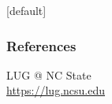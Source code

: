 \documentclass[
	hyperref={
		colorlinks,
		citecolor=DeepPink4,
		linkcolor=DarkRed,
		urlcolor=DarkRed
	},
	notes=none                   %
]{beamer}
\begin{document}

{
	[default]

	\begin{frame}[noframenumbering] %
	\frametitle{References}
	\footnotesize{
	\begin{thebibliography}{99} %
		\tiny

		 LUG @ NC State \\
			\url{https://lug.ncsu.edu}

	\end{thebibliography}
	}
	\end{frame}
}

\end{document}
